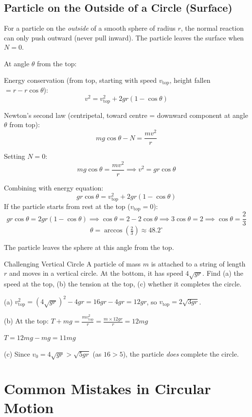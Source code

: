 \documentclass[12pt, a4paper]{book}
\begin{document}
\subsection{Particle on the Outside of a Circle (Surface)}

For a particle on the \emph{outside} of a smooth sphere of radius $r$, the normal reaction can only push outward (never pull inward). The particle leaves the surface when $N = 0$.

At angle $\theta$ from the top:

Energy conservation (from top, starting with speed $v_{\text{top}}$, height fallen $= r - r\cos\theta$):
\[
  v^2 = v_{\text{top}}^2 + 2gr(1-\cos\theta)
\]

Newton's second law (centripetal, toward centre = downward component at angle $\theta$ from top):
\[
  mg\cos\theta - N = \frac{mv^2}{r}
\]

Setting $N = 0$:
\[
  mg\cos\theta = \frac{mv^2}{r} \implies v^2 = gr\cos\theta
\]

Combining with energy equation:
\[
  gr\cos\theta = v_{\text{top}}^2 + 2gr(1 - \cos\theta)
\]
If the particle starts from rest at the top ($v_{\text{top}} = 0$):
\[
  gr\cos\theta = 2gr(1-\cos\theta) \implies \cos\theta = 2 - 2\cos\theta \implies 3\cos\theta = 2 \implies \cos\theta = \frac{2}{3}
\]
\[
  \theta = \arccos\!\left(\tfrac{2}{3}\right) \approx 48.2^\circ
\]

The particle leaves the sphere at this angle from the top.

\begin{exmp}{Challenging Vertical Circle}{}
A particle of mass $m$ is attached to a string of length $r$ and moves in a vertical circle. At the bottom, it has speed $4\sqrt{gr}$. Find (a) the speed at the top, (b) the tension at the top, (c) whether it completes the circle.

\medskip
(a) $v_{\text{top}}^2 = (4\sqrt{gr})^2 - 4gr = 16gr - 4gr = 12gr$, so $v_{\text{top}} = 2\sqrt{3gr}$.

(b) At the top: $T + mg = \frac{mv_{\text{top}}^2}{r} = \frac{m \times 12gr}{r} = 12mg$

$T = 12mg - mg = 11mg$

(c) Since $v_0 = 4\sqrt{gr} > \sqrt{5gr}$ (as $16 > 5$), the particle \emph{does} complete the circle.
\end{exmp}

\section{Common Mistakes in Circular Motion}
\end{document}
